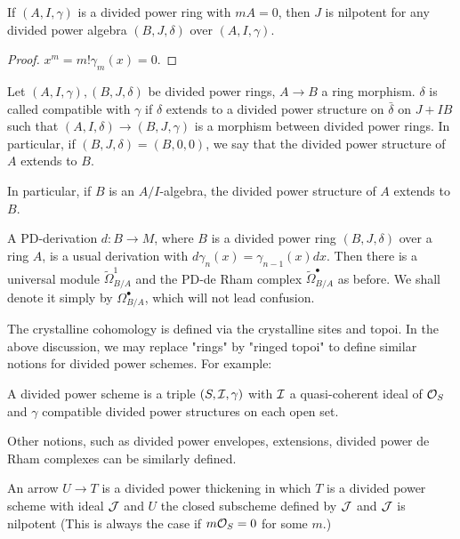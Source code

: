 \begin{proposition}
    If $(A, I, \gamma)$ is a divided power ring with $m A = 0$, 
    then $J$ is nilpotent for any divided power algebra 
    $(B, J, \delta)$ over $(A, I, \gamma)$.
\end{proposition}

\begin{proof}
    $x^m = m! \gamma_m(x) = 0$.
\end{proof}

\begin{definition}
    Let $(A, I, \gamma),(B, J, \delta)$ be divided power rings, 
    $A \to B$ a ring morphism. 
    $\delta$ is called compatible with $\gamma$ 
    if $\delta$ extends to a divided power structure on $\bar{\delta}$ on $J + IB$ 
    such that $(A, I, \delta)\to (B, J, \gamma)$ 
    is a morphism between divided power rings. 
    In particular, if $(B, J, \delta)=(B, 0, 0)$, 
    we say that the divided power structure of $A$ extends to $B$.
\end{definition}
In particular, if $B$ is an $A / I$-algebra, 
the divided power structure of $A$ extends to $B$.
\begin{definition}
    A PD-derivation $d \colon B \to M$, 
    where $B$ is a divided power ring $(B, J, \delta)$ over a ring $A$, 
    is a usual derivation with $d \gamma_n(x) = \gamma_{n-1}(x) dx$. 
    Then there is a universal module $\tilde{\Omega}_{B/A}^1$ 
    and the PD-de Rham complex $\tilde{\Omega}_{B/A}^\bullet$ as before. 
    We shall denote it simply by $\Omega_{B/A}^\bullet$, 
    which will not lead confusion.
\end{definition}
The crystalline cohomology is defined via the crystalline sites and topoi. 
In the above discussion, 
we may replace "rings" by "ringed topoi" 
to define similar notions for divided power schemes. 
For example:
\begin{definition}
    A divided power scheme is a triple $(S, {\mathcal {I}}, \gamma)$ 
    with ${\mathcal {I}}$ a quasi-coherent ideal of ${\mathcal {O}}_S$ 
    and $\gamma$ compatible divided power structures on each open set.
\end{definition}

Other notions, such as divided power envelopes, extensions, 
divided power de Rham complexes can be similarly defined.
\begin{definition}
    An arrow $U \to T$ is a divided power thickening in which 
    $T$ is a divided power scheme with ideal ${\mathcal {J}}$ and 
    $U$ the closed subscheme defined by ${\mathcal {J}}$ and 
    ${\mathcal {J}}$ is nilpotent (This is always the case if $m {\mathcal {O}}_S=0$ for some $m$.)
\end{definition}

